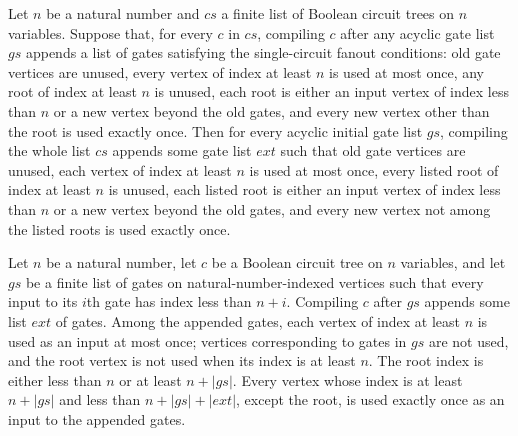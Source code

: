 \begin{theorem}
\label{BoolCircuit.compileTrees_fanout}
\leanok
{}
Let $n$ be a natural number and $cs$ a finite list of Boolean circuit trees on $n$
variables. Suppose that, for every $c$ in $cs$, compiling $c$ after any acyclic gate
list $gs$ appends a list of gates satisfying the single-circuit fanout conditions: old
gate vertices are unused, every vertex of index at least $n$ is used at most once, any
root of index at least $n$ is unused, each root is either an input vertex of index less
than $n$ or a new vertex beyond the old gates, and every new vertex other than the root
is used exactly once. Then for every acyclic initial gate list $gs$, compiling the whole
list $cs$ appends some gate list $ext$ such that old gate vertices are unused, each
vertex of index at least $n$ is used at most once, every listed root of index at least
$n$ is unused, each listed root is either an input vertex of index less than $n$ or a
new vertex beyond the old gates, and every new vertex not among the listed roots is used
exactly once.
\end{theorem}

\begin{theorem}
\label{BoolCircuit.compileTree_fanout}
\leanok
{}
Let $n$ be a natural number, let $c$ be a Boolean circuit tree on $n$ variables, and let
$gs$ be a finite list of gates on natural-number-indexed vertices such that every input
to its $i$th gate has index less than $n+i$. Compiling $c$ after $gs$ appends some list
$ext$ of gates. Among the appended gates, each vertex of index at least $n$ is used as
an input at most once; vertices corresponding to gates in $gs$ are not used, and the
root vertex is not used when its index is at least $n$. The root index is either less
than $n$ or at least $n+|gs|$. Every vertex whose index is at least $n+|gs|$ and less
than $n+|gs|+|ext|$, except the root, is used exactly once as an input to the appended
gates.
\end{theorem}

